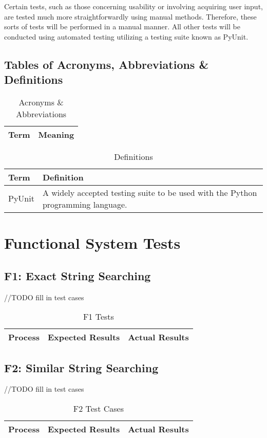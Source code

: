 \documentclass[12pt, titlepage]{article}
\begin{document}
Certain tests, such as those concerning usability or involving acquiring user input, are tested much more straightforwardly using manual methods. Therefore, these sorts of tests will be performed in a manual manner. All other tests will be conducted using automated testing utilizing a testing suite known as PyUnit.

\subsection{Tables of Acronyms, Abbreviations \& Definitions}

\begin{table}[h!]
\centering
\begin{tabular}{| p{5cm} | p{5cm} |}    \hline
	Term &Meaning\\ \hline
\end{tabular}
\caption{Acronyms \& Abbreviations}
\label{table:Acronyms and Abbreviations}
\end{table}

\begin{table}[h!]
\centering
\begin{tabular}{| p{5cm} | p{5cm} |}    \hline
	Term &Definition\\ \hline
	PyUnit &A widely accepted testing suite to be used with the Python programming language.\\ \hline
\end{tabular}
\caption{Definitions}
\label{table:Definitions}
\end{table}



\section{Functional System Tests}
\subsection{F1: Exact String Searching}
//TODO fill in test cases
\begin{table}[h!]
\centering
\begin{tabular}{| p{6cm} | p{5cm} | p{5cm} |}    \hline
	Process &Expected Results &Actual Results\\ \hline
\end{tabular}
\caption{F1 Tests}
\label{table:F1 Tests}
\end{table}

\subsection{F2: Similar String Searching}
//TODO fill in test cases
\begin{table}[h!]
\centering
\begin{tabular}{| p{6cm} | p{5cm} | p{5cm} |}    \hline
	Process &Expected Results &Actual Results\\ \hline
\end{tabular}
\caption{F2 Test Cases}
\label{table:F2 Test Cases}
\end{table}
\end{document}
